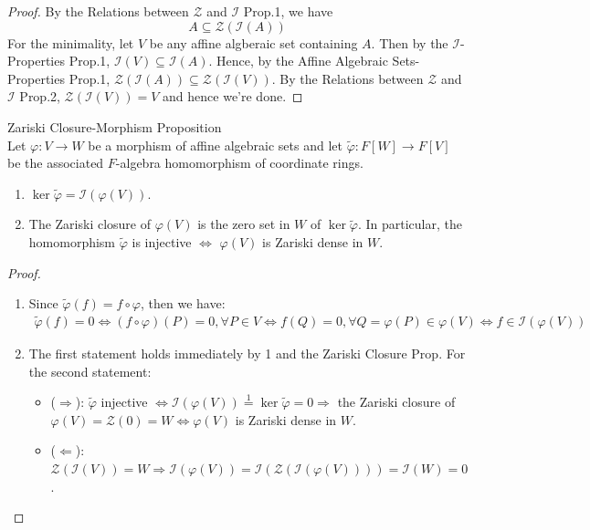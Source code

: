 \begin{proof}
    By the Relations between $\mathcal{Z}$ and $\mathcal{I}$ Prop.1, we have
    $$A \subseteq \mathcal{Z} (\mathcal{I} (A))$$
    For the minimality, let $V$ be any affine algberaic set containing $A$. Then by the $\mathcal{I}$-Properties Prop.1, $\mathcal{I} (V) \subseteq \mathcal{I} (A)$. Hence, by the Affine Algebraic Sets-Properties Prop.1, $\mathcal{Z}(\mathcal{I} (A)) \subseteq \mathcal{Z} (\mathcal{I}(V))$. By the Relations between $\mathcal{Z}$ and $\mathcal{I}$ Prop.2, $\mathcal{Z} (\mathcal{I} (V)) =V$ and hence we're done.
\end{proof}

\begin{proposition}{Zariski Closure-Morphism Proposition}\\
Let $\varphi: V \to W$ be a morphism of affine algebraic sets and let $\widetilde{\varphi}: F[W] \to F[V]$ be the associated $F$-algebra homomorphism of coordinate rings.
\begin{enumerate}
    \item $\ker \widetilde{\varphi} =\mathcal{I} (\varphi (V))$.
    \item The Zariski closure of $\varphi(V)$ is the zero set in $W$ of $\ker \widetilde{\varphi}$. In particular, the homomorphism $\widetilde{\varphi}$ is injective $\Leftrightarrow$ $\varphi (V)$ is Zariski dense in $W$.
\end{enumerate}
\end{proposition}

\begin{proof}
    \begin{enumerate}
        \item Since $\widetilde{\varphi} (f) = f \circ \varphi$, then we have:
        \begin{align*}
            \widetilde{\varphi}(f) =0 \Leftrightarrow (f \circ \varphi) (P)=0 ,\forall P\in V \Leftrightarrow f(Q)=0 ,\forall Q=\varphi(P) \in \varphi(V) \Leftrightarrow f\in \mathcal{I} (\varphi (V))
        \end{align*}

        \item The first statement holds immediately by 1 and the Zariski Closure Prop. For the second statement:
        \begin{itemize}
            \item ($\Rightarrow$): $\widetilde{\varphi}$ injective $\Leftrightarrow \mathcal{I} (\varphi (V)) \overset{1}{=} \ker \widetilde{\varphi}=0 \Rightarrow$ the Zariski closure of $\varphi (V) =\mathcal{Z} (0)=W \Leftrightarrow \varphi(V)$ is Zariski dense in $W$.

            \item ($\Leftarrow$): $\mathcal{Z} (\mathcal{I} (V)) =W \Rightarrow \mathcal{I} (\varphi  (V)) = \mathcal{I} (\mathcal{Z} (\mathcal{I} (\varphi (V)))) = \mathcal{I} (W)=0$.
        \end{itemize}
    \end{enumerate}
\end{proof}

